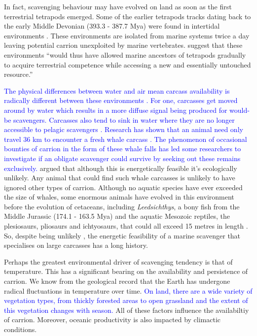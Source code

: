 \documentclass[a4paper,12pt]{article}
\begin{document}
In fact, scavenging behaviour may have evolved on land as soon as the first terrestrial tetrapods emerged.
Some of the earlier tetrapods tracks dating back to the early Middle Devonian (393.3 - 387.7 Mya) were found in intertidal environments \citep{Niedzwiedzki2009}.
These environments are isolated from marine systems twice a day leaving potential carrion unexploited by marine vertebrates.
\cite{Niedzwiedzki2009} suggest that these environments ``would thus have allowed marine ancestors of tetrapods gradually to acquire terrestrial competence while accessing a new and essentially untouched resource.''

\textcolor{blue}{The physical differences between water and air mean carcass availability is radically different between these environments \citep{beasley2012carrion}. 
For one, carcasses get moved around by water which results in a more diffuse signal being produced for would-be scavengers.
Carcasses also tend to sink in water where they are no longer accessible to pelagic scavengers \citep{beasley2012carrion}. 
\textcolor{blue}{Research has shown that an animal need only travel 36 km to encounter a fresh whale carcass \citep{smith2003ecology}.} 
The phenomenon of occasional bounties of carrion in the form of these whale falls has led some researchers to investigate if an obligate scavenger could survive by seeking out these remains exclusively.}
\cite{ruxton2005searching} argued that although this is energetically feasible it's ecologically unlikely.
Any animal that could find such whale carcasses is unlikely to have ignored other types of carrion.
Although no aquatic species have ever exceeded the size of whales, some enormous animals have evolved in this environment before the evolution of cetaceans, including \textit{Leedsichthys}, a bony fish from the Middle Jurassic (174.1 - 163.5 Mya) and the aquatic Mesozoic reptiles, the plesiosaurs, pliosaurs and ichtyosaurs, that could all exceed 15 metres in length \citep{ruxton2011zoology,danise2014ecological}.
So, despite being unlikely 
, the energetic feasibility of a marine scavenger that specialises on large carcasses has a long history.

Perhaps the greatest environmental driver of scavenging tendency is that of temperature. 
This has a significant bearing on the availability and persistence of carrion.
We know from the geological record that the Earth has undergone radical fluctuations in temperature over time.
\textcolor{blue}{On land, there are a wide variety of vegetation types, from thickly forested areas to open grassland and the extent of this vegetation changes with season.}
All of these factors influence the availabiltiy of carrion.  
Moreover, oceanic productivity is also impacted by climactic conditions. 
\end{document}
